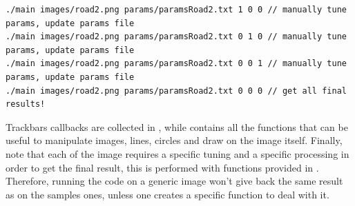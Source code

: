 \documentclass[twoside,onecolumn]{article}
\theoremstyle{definition}
\begin{document}
\begin{verbatim}
./main images/road2.png params/paramsRoad2.txt 1 0 0 // manually tune params, update params file
./main images/road2.png params/paramsRoad2.txt 0 1 0 // manually tune  params, update params file
./main images/road2.png params/paramsRoad2.txt 0 0 1 // manually tune params, update params file
./main images/road2.png params/paramsRoad2.txt 0 0 0 // get all final results!
\end{verbatim}

Trackbars callbacks are collected in , while  contains all the functions that can be useful to manipulate images, lines, circles and draw on the image itself.
Finally, note that each of the image requires a specific tuning and a specific processing in order to get the final result, this is performed with functions provided in . Therefore, running the code on a generic image won't give back the same result as on the samples ones, unless one creates a specific function to deal with it.
\end{document}

